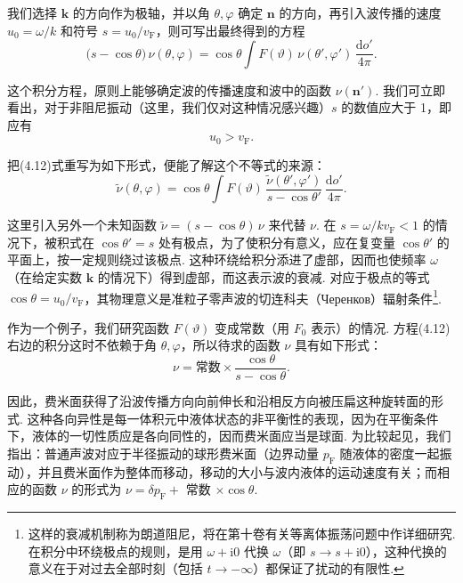 我们选择 $\bm k$ 的方向作为极轴，并以角 $\theta,\varphi$ 确定 $\bm n$ 的方向，再引入波传播的速度 $u_{0}=\omega/k$ 和符号 $s=u_{0}/v_{\mathrm F}$，则可写出最终得到的方程
\begin{equation}
\bigl(s-\cos\theta\bigr)\,\nu(\theta,\varphi)=\cos\theta\int F(\vartheta)\,\nu(\theta',\varphi')\,\frac{\mathrm{d}o'}{4\pi}.
\end{equation}

这个积分方程，原则上能够确定波的传播速度和波中的函数 $\nu(\bm n')$. 我们可立即看出，对于非阻尼振动（这里，我们仅对这种情况感兴趣）$s$ 的数值应大于 1，即应有
\begin{equation}
u_{0}>v_{\mathrm F}.
\end{equation}

把(4.12)式重写为如下形式，便能了解这个不等式的来源：
\begin{equation*}
\tilde\nu(\theta,\varphi)=\cos\theta\int F(\vartheta)\,\frac{\tilde\nu(\theta',\varphi')}{s-\cos\theta'}\,\frac{\mathrm{d}o'}{4\pi}.
\end{equation*}

这里引入另外一个未知函数 $\tilde\nu=(s-\cos\theta)\,\nu$ 来代替 $\nu$. 在 $s=\omega/kv_{\mathrm F}<1$ 的情况下，被积式在 $\cos\theta'=s$ 处有极点，为了使积分有意义，应在复变量 $\cos\theta'$ 的平面上，按一定规则绕过该极点. 这种环绕给积分添进了虚部，因而也使频率 $\omega$（在给定实数 $\bm k$ 的情况下）得到虚部，而这表示波的衰减. 对应于极点的等式 $\cos\theta=u_{0}/v_{\mathrm F}$，其物理意义是准粒子零声波的切连科夫（Черенков）辐射条件\footnote{这样的衰减机制称为朗道阻尼，将在第十卷有关等离体振荡问题中作详细研究. 在积分中环绕极点的规则，是用 $\omega+\mathrm{i}0$ 代换 $\omega$（即 $s\to s+\mathrm{i}0$），这种代换的意义在于对过去全部时刻（包括 $t\to-\infty$）都保证了扰动的有限性.}.

作为一个例子，我们研究函数 $F(\vartheta)$ 变成常数（用 $F_{0}$ 表示）的情况. 方程(4.12)右边的积分这时不依赖于角 $\theta,\varphi$，所以待求的函数 $\nu$ 具有如下形式：
\begin{equation}
\nu=\text{常数}\times\frac{\cos\theta}{s-\cos\theta}.
\end{equation}

因此，费米面获得了沿波传播方向向前伸长和沿相反方向被压扁这种旋转面的形式. 这种各向异性是每一体积元中液体状态的非平衡性的表现，因为在平衡条件下，液体的一切性质应是各向同性的，因而费米面应当是球面. 为比较起见，我们指出：普通声波对应于半径振动的球形费米面（边界动量 $p_{\mathrm F}$ 随液体的密度一起振动），并且费米面作为整体而移动，移动的大小与波内液体的运动速度有关；而相应的函数 $\nu$ 的形式为 $\nu=\delta p_{\mathrm F}+$ 常数 $\times\cos\theta$.

